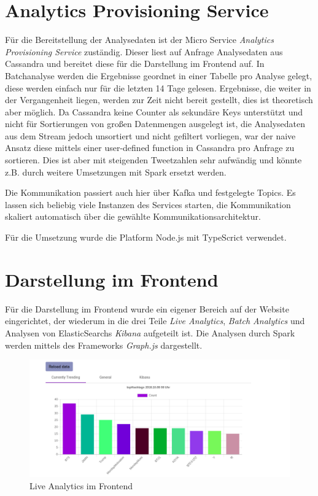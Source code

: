 


\section{Analytics Provisioning Service}

Für die Bereitstellung der Analysedaten ist der Micro Service \textit{Analytics Provisioning Service} zuständig. 
Dieser liest auf Anfrage Analysedaten aus Cassandra und bereitet diese für die Darstellung im Frontend auf.
In Batchanalyse werden die Ergebnisse geordnet in einer Tabelle pro Analyse gelegt, diese werden einfach nur für die letzten 14 Tage gelesen. Ergebnisse, die weiter in der Vergangenheit liegen, werden zur Zeit nicht bereit gestellt, dies ist theoretisch aber möglich.
Da Cassandra keine Counter als sekundäre Keys unterstützt und nicht für Sortierungen von großen Datenmengen ausgelegt ist,
die Analysedaten aus dem Stream jedoch unsortiert und nicht gefiltert vorliegen, war der naive Ansatz diese mittels einer  user-defined function in Cassandra pro Anfrage zu sortieren. Dies ist aber mit steigenden Tweetzahlen sehr aufwändig und könnte z.B. durch weitere Umsetzungen mit Spark ersetzt werden.

Die Kommunikation passiert auch hier über Kafka und festgelegte Topics.
Es lassen sich beliebig viele Instanzen des Services starten, die Kommunikation skaliert automatisch über die gewählte Kommunikationsarchitektur.

Für die Umsetzung wurde die Platform Node.js mit TypeScrict verwendet. 


\section{Darstellung im Frontend}

Für die Darstellung im Frontend wurde ein eigener Bereich auf der Website eingerichtet, der wiederum in die drei Teile
\textit{Live Analytics}, \textit{Batch Analytics} und Analysen von ElasticSearchs \textit{Kibana} aufgeteilt ist.
Die Analysen durch Spark werden mittels des Frameworks \textit{Graph.js} dargestellt.



\begin{figure}[htbp!]
	\centering
	\includegraphics[width=1.1\textwidth]{pics/analytics/currentlyTrending}
	\caption{Live Analytics im Frontend}
\end{figure}

